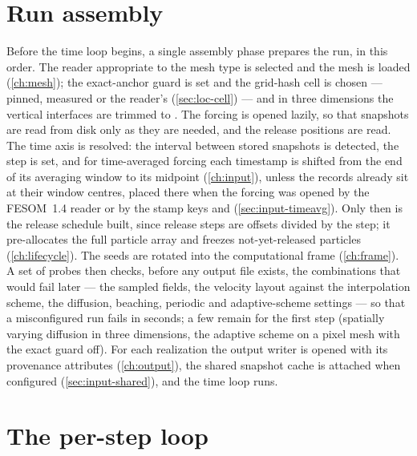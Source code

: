 
\section{Run assembly}\label{sec:arch-assembly}

Before the time loop begins, a single assembly phase prepares the run, in this order. The reader
appropriate to the mesh type is selected and the mesh is loaded (\cref{ch:mesh}); the exact-anchor guard is
set and the grid-hash cell is chosen --- pinned, measured or the reader's (\cref{sec:loc-cell}) --- and in three
dimensions the vertical interfaces are trimmed to . The forcing is opened lazily, so that
snapshots are read from disk only as they are needed, and the release positions are read. The time axis is
resolved: the interval between stored snapshots is detected, the step is set, and for time-averaged forcing
each timestamp is shifted from the end of its averaging window to its midpoint (\cref{ch:input}), unless the
records already sit at their window centres, placed there when the forcing was opened by the FESOM~1.4 reader
or by the stamp keys  and  (\cref{sec:input-timeavg}). Only then is
the release schedule built, since release steps are offsets divided by the step; it pre-allocates the full
particle array and freezes not-yet-released particles (\cref{ch:lifecycle}). The seeds are rotated into the
computational frame (\cref{ch:frame}). A set of probes then checks, before any output file exists, the
combinations that would fail later --- the sampled fields, the velocity layout against the interpolation scheme,
the diffusion, beaching, periodic and adaptive-scheme settings --- so that a misconfigured run fails in
seconds; a few remain for the first step (spatially varying diffusion in three dimensions, the adaptive
scheme on a pixel mesh with the exact guard off). For each realization the output writer is opened with its provenance attributes (\cref{ch:output}),
the shared snapshot cache is attached when configured (\cref{sec:input-shared}), and the time loop runs.


\section{The per-step loop}\label{sec:arch-loop}

